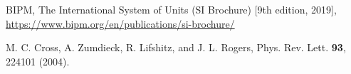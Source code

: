 
\begin{thebibliography}{99}


BIPM, The International System of Units (SI Brochure) [9th edition, 2019],
\url{https://www.bipm.org/en/publications/si-brochure/}



M. C. Cross, A. Zumdieck, R. Lifshitz, and J. L. Rogers, Phys. Rev. Lett. \textbf{93}, 224101 (2004).


\end{thebibliography}